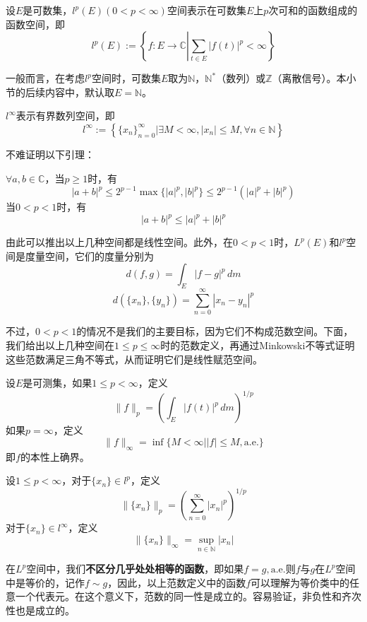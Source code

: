 \documentclass{ctexbook}
\begin{document}
\begin{definition}[$l^p$空间]
    设$E$是可数集，$l^p(E)(0<p<\infty)$空间表示在可数集$E$上$p$次可和的函数组成的函数空间，即
    \[l^p(E):=\left\{f:E\rightarrow \mathbb{C} \left| \sum_{t\in E}|f(t)|^p<\infty\right.\right\}\]
\end{definition}

一般而言，在考虑$l^p$空间时，可数集$E$取为$\mathbb{N}$，$\mathbb{N} ^*$（数列）或$\mathbb{Z}$（离散信号）。本小节的后续内容中，默认取$E=\mathbb{N}$。

\begin{definition}[$l^{\infty}$空间]
    $l^{\infty}$表示有界数列空间，即
    \[l^{\infty}:=\left\{\{x_n\}_{n=0}^{\infty} \left|\exists M<\infty,|x_n|\leq M,\forall n\in \mathbb{N}\right.\right\}\]
\end{definition}

不难证明以下引理：
\begin{lemma}
    $\forall a,b\in\mathbb{C}$，当$p\geq 1$时，有
    \[|a+b|^p\leq 2^{p-1}\max\{|a|^p,|b|^p\}\leq 2^{p-1}(|a|^p+|b|^p)\]
    当$0<p<1$时，有
    \[|a+b|^p\leq |a|^p+|b|^p\]
\end{lemma}

由此可以推出以上几种空间都是线性空间。此外，在$0<p<1$时，$L^p(E)$和$l^p$空间是度量空间，它们的度量分别为
\[d(f,g)=\int_{E}|f-g|^p\,dm\]
\[d(\{x_n\},\{y_n\})=\sum_{n=0}^{\infty}|x_n-y_n|^p\]

不过，$0<p<1$的情况不是我们的主要目标，因为它们不构成范数空间。下面，我们给出以上几种空间在$1\leq p \leq \infty$时的范数定义，再通过Minkowski不等式证明这些范数满足三角不等式，从而证明它们是线性赋范空间。

\begin{definition}[$L^p$空间的范数]
    设$E$是可测集，如果$1\leq p<\infty$，定义
    \[\|f\|_p=\left(\int_{E}|f(t)|^p\,dm\right)^{1/p}\]
    如果$p=\infty$，定义
    \[\|f\|_{\infty}=\inf\{M<\infty||f|\leq M,\text{a.e.}\}\]
    即$f$的本性上确界。
\end{definition}

\begin{definition}[$l^p$空间的范数]
    设$1\leq p<\infty$，对于$\{x_n\}\in l^p$，定义
    \[\|\{x_n\}\|_p=\left(\sum_{n=0}^{\infty}|x_n|^p\right)^{1/p}\]
    对于$\{x_n\}\in l^{\infty}$，定义
    \[\|\{x_n\}\|_{\infty}=\sup_{n\in \mathbb{N}}|x_n|\]
\end{definition}

在$L^p$空间中，我们\textbf{不区分几乎处处相等的函数}，即如果$f=g,\text{a.e.}$则$f$与$g$在$L^p$空间中是等价的，记作$f\sim g$，因此，以上范数定义中的函数$f$可以理解为等价类中的任意一个代表元。在这个意义下，范数的同一性是成立的。容易验证，非负性和齐次性也是成立的。
\end{document}
